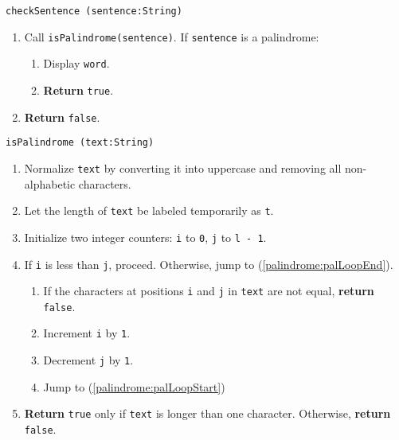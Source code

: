 \vspace{5mm}
{\tt checkSentence (sentence:String)}
\begin{enumerate}
	\item	Call {\tt isPalindrome(sentence)}. If {\tt sentence} is a palindrome:
	\begin{enumerate}
		\item	Display {\tt word}.
		\item	{\bf Return} {\tt true}.
	\end{enumerate}
\item	{\bf Return} {\tt false}.
\end{enumerate}
\vspace{5mm}
{\tt isPalindrome (text:String)}
\begin{enumerate}
	\item	Normalize {\tt text} by converting it into uppercase and removing all non-alphabetic characters.
	\item	Let the length of {\tt text} be labeled temporarily as {\tt t}.
	\item	Initialize two integer counters: {\tt i} to {\tt 0}, {\tt j} to {\tt l - 1}.
	\item	If {\tt i} is less than {\tt j}, proceed.
			Otherwise, jump to (\ref{palindrome:palLoopEnd}). \label{palindrome:palLoopStart}
	\begin{enumerate}
		\item	If the characters at positions {\tt i} and {\tt j} in {\tt text} are not equal,
				{\bf return} {\tt false}.
		\item	Increment {\tt i} by {\tt 1}.
		\item	Decrement {\tt j} by {\tt 1}.
		\item	Jump to (\ref{palindrome:palLoopStart})
	\end{enumerate}
	\item	{\bf Return} {\tt true} only if {\tt text} is longer than
			one character. Otherwise, {\bf return} {\tt false}. \label{palindrome:palLoopEnd}
\end{enumerate}

\sourcecode


